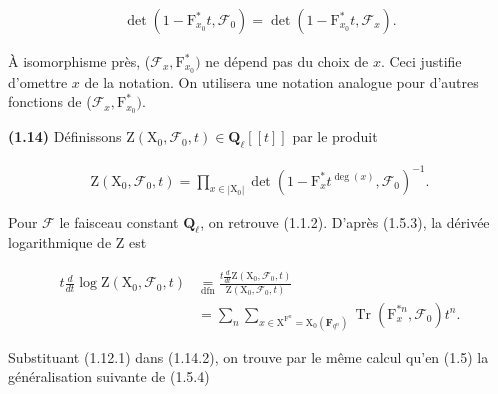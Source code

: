 \documentclass[10pt,leqno]{article}
\begin{document}
\begin{equation*}\begin{gathered}\operatorname{det}(1- \mathrm{F}_{x_{0}}^{*}t,\mathcal{F} _{0}) = \operatorname{det}(1- \mathrm{F}_{x_{0}}^{*}t,\mathcal{F} _{x}).\end{gathered}\end{equation*}

\noindent À isomorphisme près, (\(\mathcal{F} _{x},\mathrm{F}_{x_{0}}^{*})\) ne dépend pas du choix de \(x\). Ceci justifie d’omettre \(x\) de la notation. On utilisera une notation analogue pour d’autres fonctions de (\(\mathcal{F} _{x},\mathrm{F}_{x_{0}}^{*})\).\par

\clearpage

\label{physical-8}\par\smallskip

\noindent \textbf{(1.14)} Définissons \(\mathrm{Z}(\mathrm{X}_{0},\mathcal{F} _{0},t)\in \mathbf{Q}_{\ell }[[t]]\) par le produit\par

\begin{equation*}\begin{gathered}\mathrm{Z}(\mathrm{X}_{0},\mathcal{F} _{0},t) = \prod _{x\in |\mathrm{X}_{0}|} \operatorname{det}(1- \mathrm{F}_{x}^{*}t^{\operatorname{deg}(x)},\mathcal{F} _{0})^{- 1}.\end{gathered}\tag{1.14.1}\end{equation*}

\noindent Pour \(\mathcal{F} \) le faisceau constant \(\mathbf{Q}_{\ell }\), on retrouve (1.1.2). D’après (1.5.3), la dérivée logarithmique de \(\mathrm{Z}\) est\par

\begin{equation*}\begin{aligned}
t\frac{d}{dt}\log\mathrm Z(\mathrm X_0,\mathcal F_0,t)
&\underset{\mathrm{dfn}}{=}\frac{t\frac{d}{dt}\mathrm Z(\mathrm X_0,\mathcal F_0,t)}{\mathrm Z(\mathrm X_0,\mathcal F_0,t)}\\
&=\sum_n\sum_{x\in\mathrm X^{\mathrm F^n}=\mathrm X_0(\mathbf F_{q^n})}\operatorname{Tr}(\mathrm F_x^{*n},\mathcal F_0)t^n.
\end{aligned}\tag{1.14.2}\end{equation*}

\noindent Substituant (1.12.1) dans (1.14.2), on trouve par le même calcul qu’en (1.5) la généralisation suivante de (1.5.4)\par
\end{document}

